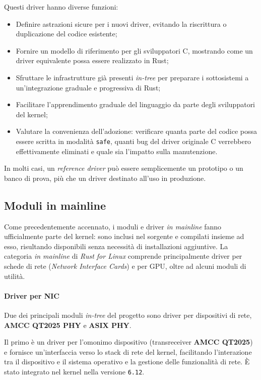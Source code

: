 \noindent Questi driver hanno diverse funzioni:
\begin{itemize}
    \item Definire astrazioni sicure per i nuovi driver, evitando la riscrittura o duplicazione del codice esistente;
    \item Fornire un modello di riferimento per gli sviluppatori C, mostrando come un driver equivalente possa essere realizzato in Rust;
    \item Sfruttare le infrastrutture già presenti \textit{in-tree} per preparare i sottosistemi a un'integrazione graduale e progressiva di Rust;
    \item Facilitare l'apprendimento graduale del linguaggio da parte degli sviluppatori del kernel;
    \item Valutare la convenienza dell'adozione: verificare quanta parte del codice possa essere scritta in modalità \texttt{safe}, quanti bug del driver originale C verrebbero effettivamente eliminati e quale sia l'impatto sulla manutenzione.
\end{itemize}
In molti casi, un \textit{reference driver} può essere semplicemente un prototipo o un banco di prova, più che un driver destinato all'uso in produzione.

\subsection{Moduli in mainline} 
Come precedentemente accennato, i moduli e driver \textit{in mainline} fanno ufficialmente parte del kernel: sono inclusi nel 
sorgente e compilati insieme ad esso, risultando disponibili senza necessità di installazioni aggiuntive.
La categoria \textit{in mainline} di \textit{Rust for Linux} comprende principalmente driver per schede di rete (\textit{Network Interface Cards}) e per GPU, oltre ad 
alcuni moduli di utilità.

\paragraph{Driver per NIC}
Due dei principali moduli \textit{in-tree} del progetto sono driver per dispositivi di rete, \textbf{AMCC QT2025 PHY} e \textbf{ASIX PHY}.\ 

Il primo è un driver per l'omonimo dispositivo (transreceiver \textbf{AMCC QT2025}) e fornisce un'interfaccia verso lo 
stack di rete del kernel, facilitando l'interazione tra 
il dispositivo e il sistema operativo e la gestione delle funzionalità di rete.
È stato integrato nel kernel nella versione \texttt{6.12}.

